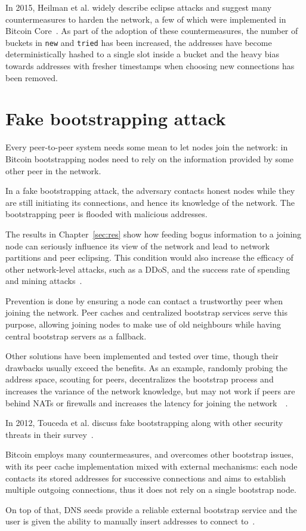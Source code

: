 In 2015, Heilman et al. widely describe eclipse attacks and suggest many countermeasures to harden the network, a few of which were implemented in Bitcoin Core~\cite{eclipseatk}. As part of the adoption of these countermeasures, the number of buckets in \texttt{new} and \texttt{tried} has been increased, the addresses have become deterministically hashed to a single slot inside a bucket and the heavy bias towards addresses with fresher timestamps when choosing new connections has been removed.

\section{Fake bootstrapping attack}\label{sec:fakeboot}
Every peer-to-peer system needs some mean to let nodes join the network: in Bitcoin bootstrapping nodes need to rely on the information provided by some other peer in the network.

In a fake bootstrapping attack, the adversary contacts honest nodes while they are still initiating its connections, and hence its knowledge of the network. The bootstrapping peer is flooded with malicious addresses.

The results in Chapter~\ref{sec:res} show how feeding bogus information to a joining node can seriously influence its view of the network and lead to network partitions and peer eclipsing. This condition would also increase the efficacy of other network-level attacks, such as a DDoS, and the success rate of spending and mining attacks~\cite{eclipseatk}.\par

Prevention is done by ensuring a node can contact a trustworthy peer when joining the network. Peer caches and centralized bootstrap services serve this purpose, allowing joining nodes to make use of old neighbours while having central bootstrap servers as a fallback.

Other solutions have been implemented and tested over time, though their drawbacks usually exceed the benefits. As an example, randomly probing the address space, scouting for peers, decentralizes the bootstrap process and increases the variance of the network knowledge, but may not work if peers are behind NATs or firewalls and increases the latency for joining the network~\cite{decentrbootstrapp2p}~\cite{localityaware}.

In 2012,  Touceda et al. discuss fake bootstrapping along with other security threats in their survey~\cite{toucedafakeboot}.

Bitcoin employs many countermeasures, and overcomes other bootstrap issues, with its peer cache implementation mixed with external mechanisms: each node contacts its stored addresses for successive connections and aims to establish multiple outgoing connections, thus it does not rely on a single bootstrap node.

On top of that, DNS seeds provide a reliable external bootstrap service and the user is given the ability to manually insert addresses to connect to~\cite{mahmoud_netsec_boot}.